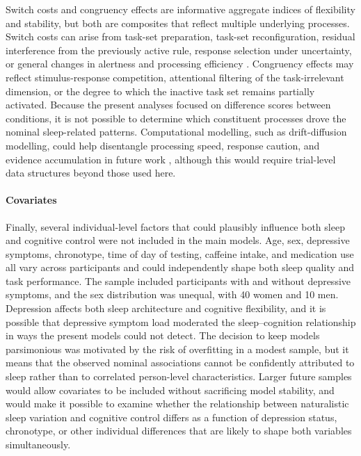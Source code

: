 \documentclass[12pt,a4paper]{report}
\begin{document}
Switch costs and congruency effects are informative aggregate indices of flexibility and stability, but both are composites that reflect multiple underlying processes. Switch costs can arise from task-set preparation, task-set reconfiguration, residual interference from the previously active rule, response selection under uncertainty, or general changes in alertness and processing efficiency \parencite{kiesel2010review, monsell2003switching, rogers1995taskswitch}. Congruency effects may reflect stimulus-response competition, attentional filtering of the task-irrelevant dimension, or the degree to which the inactive task set remains partially activated. Because the present analyses focused on difference scores between conditions, it is not possible to determine which constituent processes drove the nominal sleep-related patterns. Computational modelling, such as drift-diffusion modelling, could help disentangle processing speed, response caution, and evidence accumulation in future work \parencite{bogacz2010speedaccuracy}, although this would require trial-level data structures beyond those used here.


\paragraph{Covariates}

Finally, several individual-level factors that could plausibly influence both sleep and cognitive control were not included in the main models. Age, sex, depressive symptoms, chronotype, time of day of testing, caffeine intake, and medication use all vary across participants and could independently shape both sleep quality and task performance. The sample included participants with and without depressive symptoms, and the sex distribution was unequal, with 40 women and 10 men. Depression affects both sleep architecture and cognitive flexibility, and it is possible that depressive symptom load moderated the sleep–cognition relationship in ways the present models could not detect. The decision to keep models parsimonious was motivated by the risk of overfitting in a modest sample, but it means that the observed nominal associations cannot be confidently attributed to sleep rather than to correlated person-level characteristics. Larger future samples would allow covariates to be included without sacrificing model stability, and would make it possible to examine whether the relationship between naturalistic sleep variation and cognitive control differs as a function of depression status, chronotype, or other individual differences that are likely to shape both variables simultaneously.
\end{document}
